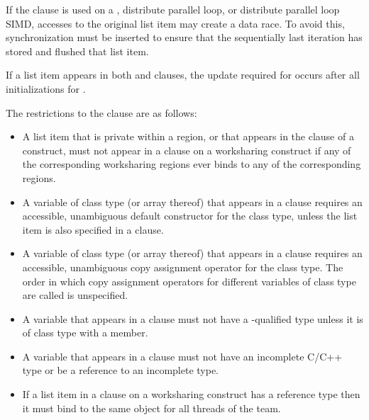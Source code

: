 {{{{If the  clause is used on a , distribute parallel loop, or distribute parallel loop SIMD, accesses to the original list item may create a data race. To avoid this, synchronization must be inserted to ensure that the sequentially last iteration has stored and flushed that list item.

If a list item appears in both  and  clauses, the update 
required for  occurs after all initializations for .

\restrictions
The restrictions to the  clause are as follows:

\begin{itemize}
\item A list item that is private within a  region, or
that appears in the  clause of a 
construct, must not appear in a  clause on a
worksharing construct if any of the corresponding
worksharing regions ever binds to any of the corresponding
 regions.

\cppspecificstart
\item A variable of class type (or array thereof) that appears in a  clause 
requires an accessible, unambiguous default constructor for the class type, unless the 
list item is also specified in a  clause. 

\item A variable of class type (or array thereof) that appears in a  clause 
requires an accessible, unambiguous copy assignment operator for the class type. The 
order in which copy assignment operators for different variables of class type are 
called is unspecified.
\cppspecificend

\ccppspecificstart
\item A variable that appears in a  clause must not have a -qualified 
type unless it is of class type with a  member. 

\item A variable that appears in a  clause must not have an incomplete C/C++ type or be a reference to an incomplete type.

\item If a list item in a  clause on a worksharing
construct has a reference type then it must bind to the same object for all threads of the team.
\ccppspecificend


\end{itemize}}}}}
